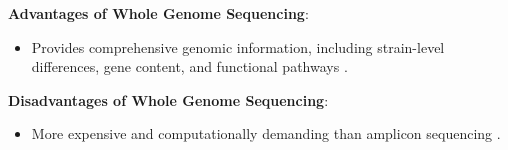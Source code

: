 \textbf{Advantages of Whole Genome Sequencing}:
\begin{itemize}
    \item Provides comprehensive genomic information, including strain-level differences, gene content, and functional pathways \cite*{L5-DNAEnrichment}.
\end{itemize}

\textbf{Disadvantages of Whole Genome Sequencing}:
\begin{itemize}
    \item More expensive and computationally demanding than amplicon sequencing \cite*{L5-DNAEnrichment,L3-SeqBasedClass}.
\end{itemize}






